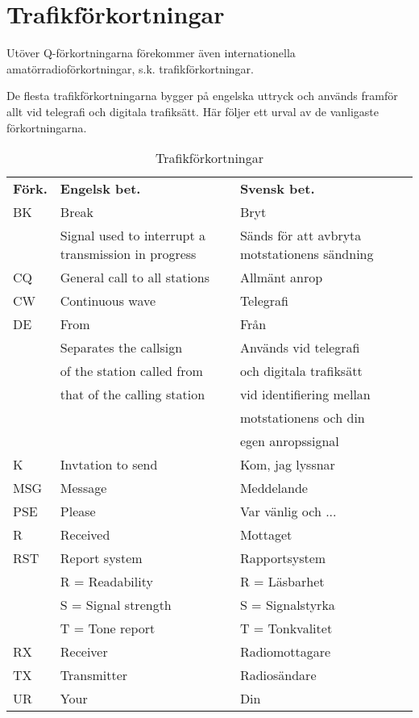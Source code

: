 \section{Trafikförkortningar}

Utöver Q-förkortningarna förekommer även internationella
amatörradioförkortningar, s.k. trafikförkortningar.

De flesta trafikförkortningarna bygger på engelska uttryck och används
framför allt vid telegrafi och digitala trafiksätt. Här följer ett
urval av de vanligaste förkortningarna.

\begin{table}[h]
  \begin{tabularx}{\columnwidth}{lXX}
    \textbf{Förk.} & \textbf{Engelsk bet.} & \textbf{Svensk bet.}\\
    BK & Break & Bryt\\
    & Signal used to interrupt a  transmission in progress
    & Sänds för att avbryta motstationens sändning\\
    CQ & General call to all stations & Allmänt anrop\\
    CW & Continuous wave & Telegrafi\\
    DE & From & Från\\
    & Separates the callsign      & Används vid telegrafi \\
    & of the station called from  & och digitala trafiksätt\\
    & that of the calling station & vid identifiering mellan\\
    &                             & motstationens och din \\
    &                             & egen anropssignal\\
    K & Invtation to send & Kom, jag lyssnar\\
    MSG & Message & Meddelande\\
    PSE & Please & Var vänlig och ...\\
    R & Received & Mottaget\\
    RST & Report system & Rapportsystem\\
    & R = Readability & R = Läsbarhet\\
    & S = Signal strength & S = Signalstyrka\\
    & T = Tone report & T = Tonkvalitet\\
    RX & Receiver & Radiomottagare\\
    TX & Transmitter & Radiosändare\\
    UR & Your & Din\\
  \end{tabularx}
  \caption{Trafikförkortningar}
  \label{tab:trafikforkortningar}
\end{table}


